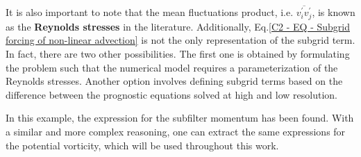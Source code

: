 It is also important to note that the mean fluctuations product, i.e. $\overline{v_i^{\prime} v_j^{\prime}}$, is known as the \textbf{Reynolds stresses} in the literature. Additionally, Eq.\ref{C2 - EQ - Subgrid forcing of non-linear advection} is not the only representation of the subgrid term. In fact, there are two other possibilities. The first one is obtained by formulating the problem such that the numerical model requires a parameterization of the Reynolds stresses. Another option involves defining subgrid terms based on the difference between the prognostic equations solved at high and low resolution.

\newpage

In this example, the expression for the subfilter momentum has been found. With a similar and more complex reasoning, one can extract the same expressions for the potential vorticity, which will be used throughout this work.

